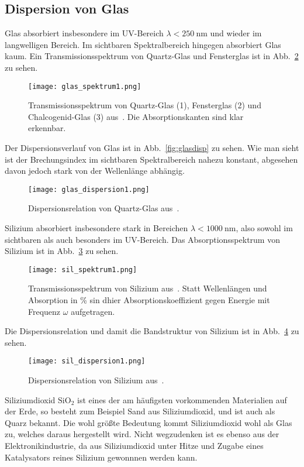 \subsection{\label{subsec:FZV6}Dispersion von Glas}
Glas absorbiert insbesondere im UV-Bereich $\lambda < \SI[]{250}{\nano\metre}$ und wieder im langwelligen Bereich. Im sichtbaren Spektralbereich hingegen absorbiert Glas kaum. Ein Transmissionsspektrum von Quartz-Glas und Fensterglas ist in Abb.~\ref{fig:glasabs} zu sehen.

\begin{figure}
    \centering
    \texttt{[image: glas\_spektrum1.png]}
    \caption{Transmissionsspektrum von Quartz-Glas (1), Fensterglas (2) und Chalcogenid-Glas (3) aus~\cite{glass}. Die Absorptionskanten sind klar erkennbar.}
    \label{fig:glasabs}
\end{figure}

Der Dispersionsverlauf von Glas ist in Abb.~\ref{fig:glasdisp} zu sehen. Wie man sieht ist der Brechungsindex im sichtbaren Spektralbereich nahezu konstant, abgesehen davon jedoch stark von der Wellenlänge abhängig.

\begin{figure}
    \centering
    \texttt{[image: glas\_dispersion1.png]}
    \caption{Dispersionsrelation von Quartz-Glas aus~\cite{glass}.}
    \label{fig:glasabs}
\end{figure}

Silizium absorbiert insbesondere stark in Bereichen $\lambda < \SI[]{1000}{\nano\metre}$, also sowohl im sichtbaren als auch besonders im UV-Bereich. Das Absorptionsspektrum von Silizium ist in Abb.~\ref{fig:siliziumabs} zu sehen.  

\begin{figure}
    \centering
    \texttt{[image: sil\_spektrum1.png]}
    \caption{Transmissionsspektrum von Silizium aus~\cite{silicon}. Statt Wellenlängen und Absorption in \% sin dhier Absorptionskoeffizient gegen Energie mit Frequenz $\omega$ aufgetragen.}
    \label{fig:siliziumabs}
\end{figure}

Die Dispersionsrelation und damit die Bandstruktur von Silizium ist in Abb.~\ref{fig:sildisp} zu sehen. 

\begin{figure}
    \centering
    \texttt{[image: sil\_dispersion1.png]}
    \caption{Dispersionsrelation von Silizium aus~\cite{silicon}.}
    \label{fig:sildisp}
\end{figure}

Siliziumdioxid $\mathrm{SiO}_2$ ist eines der am häufigsten vorkommenden Materialien auf der Erde, so besteht zum Beispiel Sand aus Siliziumdioxid, und ist auch als Quarz bekannt. Die wohl größte Bedeutung kommt Siliziumdioxid wohl als Glas zu, welches daraus hergestellt wird. Nicht wegzudenken ist es ebenso aus der Elektronikindustrie, da aus Siliziumdioxid unter Hitze und Zugabe eines Katalysators reines Silizium gewonnnen werden kann.